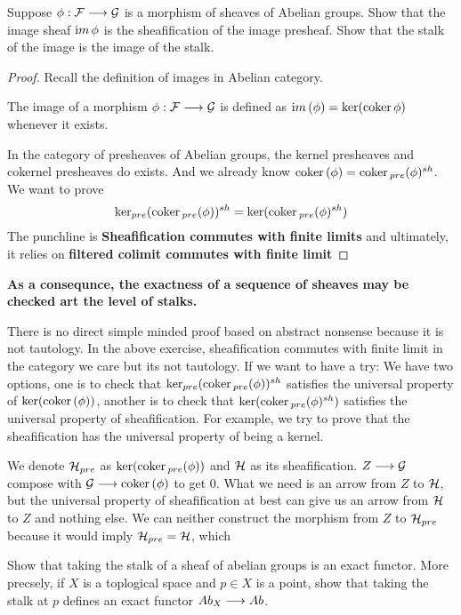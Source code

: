 \begin{exr}
Suppose $\phi:{\cal F}\longrightarrow {\cal G}$ is a morphism of sheaves of Abelian groups. Show that the image sheaf ${\text im\thinspace} \phi$ is the sheafification of the image presheaf. Show that the stalk of the image is the image of the stalk.
\end{exr}
\begin{proof}
Recall the definition of images in Abelian category.

The image of a morphism $\phi : {\cal F} \longrightarrow {\cal G}$ is defined as ${\text im\thinspace}(\phi) = \ker(\text{coker\,} \phi)$ whenever it exists.

In the category of presheaves of Abelian groups, the kernel presheaves and cokernel presheaves do exists. And we already know $\text{coker\,}(\phi)=\text{coker\,}_{pre}(\phi)^{sh}$. We want to prove
$$
\ker_{pre}(\text{coker\,}_{pre}(\phi))^{sh}=\ker(\text{coker\,}_{pre}(\phi)^{sh})
$$
The punchline is \textbf{Sheafification commutes with finite limits} and ultimately, it relies on \textbf{filtered colimit commutes with finite limit}

\end{proof}
\textbf{As a consequnce, the exactness of a sequence of sheaves may be checked art the level of stalks.}
\begin{remark}
There is no direct simple minded proof based on abstract nonsense because it is not tautology. In the above exercise, sheafification commutes with finite limit in the category we care but its not tautology. If we want to have a try: We have two options, one is to check that $\ker_{pre}(\text{coker\,}_{pre}(\phi))^{sh}$ satisfies the universal property of $\ker(\text{coker\,}(\phi))$, another is to check that $\ker(\text{coker\,}_{pre}(\phi)^{sh})$ satisfies the universal property of sheafification. For example, we try to prove that the sheafification has the universal property of being a kernel.
\begin{center}
\end{center}
We denote ${\cal H}_{pre}$ as $\ker(\text{coker\,}_{pre}(\phi))$ and ${\cal H}$ as its sheafification.
$Z\longrightarrow {\cal G}$ compose with ${\cal G}\longrightarrow \text{coker\,}(\phi)$ to get $0$.
What we need is an arrow from $Z$ to ${\cal H}$, but the universal property of sheafification at best can give us an arrow from ${\cal H}$ to $Z$ and nothing else. We can neither construct the morphism from $Z$ to ${\cal H}_{pre}$ because it would imply ${\cal H}_{pre}={\cal H}$, which 
\end{remark}
\begin{exr}
Show that taking the stalk of a sheaf of abelian groups is an exact functor. More precsely, if $X$ is a toplogical space and $p\in X$ is a point, show that taking the stalk at $p$ defines an exact functor $Ab_X\longrightarrow Ab$.
\end{exr}

